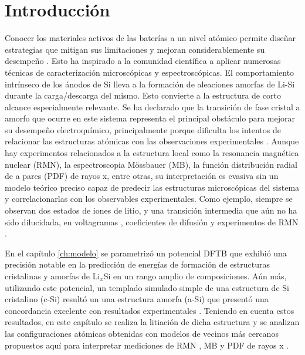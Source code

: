 \section{Introducción}

Conocer los materiales activos de las baterías a un nivel atómico permite diseñar
estrategias que mitigan sus
limitaciones y mejoran considerablemente su desempeño \cite{liu2019review}.
Esto ha inspirado a la comunidad científica a aplicar numerosas técnicas 
de caracterización microscópicas y espectroscópicas. El comportamiento 
intrínseco de los ánodos de Si lleva a la formación de aleaciones amorfas de 
Li-Si durante la carga/descarga del mismo. Esto convierte a la estructura
de corto alcance especialmente relevante. Se ha declarado que la transición de 
fase cristal a amorfo que ocurre en este sistema representa el principal 
obstáculo para mejorar su desempeño electroquímico, principalmente porque 
dificulta los intentos de relacionar las estructuras atómicas con las 
observaciones experimentales \cite{key2011}. Aunque hay experimentos 
relacionados a la estructura local como la resonancia magnética nuclear (RMN),
la espectroscopia Mössbauer (MB), la función distribución radial de a pares 
(PDF) de rayos x, entre otras, su interpretación es evasiva sin un modelo 
teórico preciso capaz de predecir las estructuras microscópicas del sistema
y correlacionarlas con los observables experimentales. Como ejemplo, siempre 
se observan dos estados de iones de litio, y una transición intermedia que aún 
no ha sido dilucidada, en voltagramas \cite{pan2019}, coeficientes de 
difusión \cite{ding2009} y experimentos de RMN \cite{key2009}.

En el capítulo \ref{ch:modelo} se parametrizó un potencial DFTB que exhibió 
una precisión notable en la predicción de energías de formación de 
estructuras cristalinas y amorfas de Li$_x$Si en un rango amplio de 
composiciones. Aún más, utilizando este potencial, un templado simulado simple
de una estructura de Si cristalino (c-Si) resultó un una estructura amorfa 
(a-Si) que presentó una concordancia excelente con resultados experimentales
\cite{laaziri1999}. Teniendo en cuenta estos resultados, en este capítulo se realiza
la litiación de dicha estructura y se analizan las configuraciones atómicas obtenidas 
con modelos de vecinos más cercanos propuestos aquí para 
interpretar mediciones de RMN \cite{ogata2014, key2011, koster2011, key2009}, 
MB \cite{li2009} y PDF de rayos x \cite{key2011, laaziri1999}.
